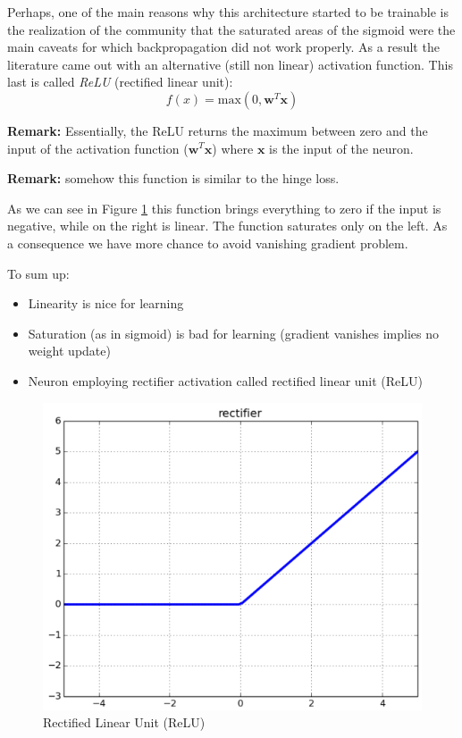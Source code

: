 Perhaps, one of the main reasons why this architecture started to be trainable is
the realization of the community that the saturated areas of the sigmoid were the
main caveats for which backpropagation did not work properly. As a result the
literature came out with an alternative (still non linear) activation function. This
last is called \textit{ReLU} (rectified linear unit):
\begin{equation}
	f(x) = \text{max}(0, \pmb{w}^{T}\pmb{x})
\end{equation}

\textbf{Remark:} Essentially, the ReLU returns the maximum between zero and the
input of the activation function ($\pmb{w}^{T}\pmb{x}$) where $\pmb{x}$ is the
input of the neuron.
\newline

\textbf{Remark:} somehow this function is similar to the hinge loss.
\newline

As we can see in Figure \ref{fig:relu} this function brings everything to zero if
the input is negative, while on the right is linear. The function saturates only
on the left. As a consequence we have more chance to avoid vanishing gradient
problem.
\newline

To sum up:
\begin{itemize}
	\item Linearity is nice for learning

	\item Saturation (as in sigmoid) is bad for learning (gradient vanishes
		implies no weight update)

	\item Neuron employing rectifier activation called rectified linear unit (ReLU)
\end{itemize}

\begin{figure}[H]
	\centering
	\includegraphics[scale=0.5]{
        images/16_DeepLearning_relu.png
    }
	\caption{Rectified Linear Unit (ReLU)}
	\label{fig:relu}
\end{figure}

